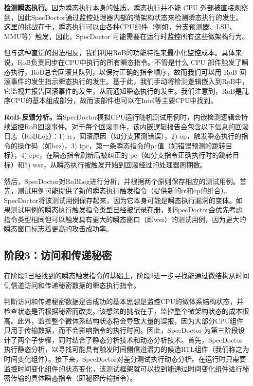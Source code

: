 \textbf{检测瞬态执行。}因为瞬态执行本身的性质，瞬态执行并不能 CPU 外部被直接观察到，因此SpecDoctor通过监控处理器内部的微架构状态来检测瞬态执行的发生。这里的挑战在于，瞬态执行可以由各种CPU组件（例如，分支预测器、LSU、MMU等）触发，因此，SpecDoctor 可能需要在运行时监控所有这些微架构行为。\par

但与这种直觉的想法相反，我们利用RoB的功能特性来最小化监控成本。具体来说，RoB负责同步在CPU中执行的所有瞬态指令。不管是什么 CPU 部件触发了瞬态执行，RoB总会回滚其队列，以保持正确的指令顺序，故而我们可以用 RoB 回滚事件的发生指示瞬态执行的发生。基于此，我们手动将检测逻辑嵌入到RoB中，它监视并报告回滚事件的发生，从而通知瞬态执行的发生。我们注意到，RoB是乱序CPU的基本组成部分，故而该部件也可以在Intel等主要CPU中找到。\par

\textbf{RoB-反馈分析。}当SpecDoctor模拟CPU运行随机测试用例时，内嵌检测逻辑会持续监控RoB回滚事件。对于每个回滚事件，该内嵌逻辑报告会包含以下信息的回滚日志（RoBLog）：1) rr，回滚原因（如分支预测错误），2) op，触发瞬态执行的指令的操作码（如bez)，3) tpc，第一条瞬态指令的pc值（如错误预测的跳转目标），4) cpc，在瞬态指令刷新后被纠正的 pc（如分支指令正确执行时的跳转目标）和5) wsz，从瞬态执行被触发开始到回滚经过的处理器周期数。\par

然后，SpecDoctor对RoBLog进行分析，并根据两个原则保存相应的测试用例。首先，测试用例可能提供了新的瞬态执行触发指令（提供新的rr和op的组合）。SpecDoctor将该测试用例保存起来，因为它本身可能是瞬态执行漏洞的变体。如果测试用例的瞬态执行触发指令类型已经被记录在册，则SpecDoctor会优先考虑指令类型相同但可以触发具有更大的瞬态窗口（即wsz）的测试用例，因为更大的瞬态窗口标志着更高的攻击成功率。\par

\subsection{阶段3：访问和传递秘密}

在阶段2已经找到的瞬态触发指令的基础上，阶段3进一步寻找能通过微结构从时间侧信道访问和传递秘密数据的瞬态执行指令。\par

判断访问和传递秘密数据是否成功的基本思想是监控CPU的微体系结构状态，并检查状态是否根据秘密而改变。该想法的挑战在于，监控整个微架构状态的成本很高。此外，监控整个微体系结构状态将会导致大量的误报，因为大部分CPU组件只用于传输数据，而不会影响指令的执行时间。因此，SpecDoctor 为第三阶段设计了两个子步骤，同时结合了静态分析技术和动态分析技术。首先，SpecDoctor执行静态分析，以寻找可能具有触发时间侧信道潜力的候选RTL组件（我们称之为时间变化组件）。接下来，SpecDoctor对差分测试执行动态分析。在运行时只需要监控时间变化组件的状态变化，该测试框架就可以找到能通过时间变化组件进行秘密传输的具体瞬态指令（即秘密传输指令）。\par

